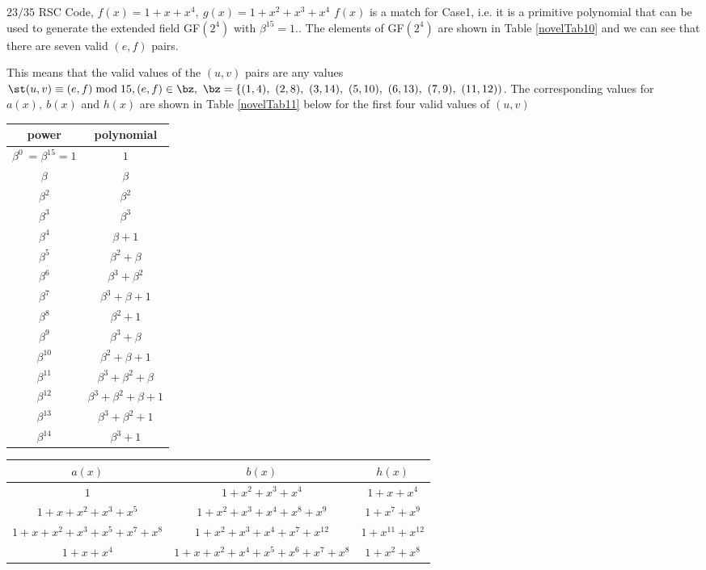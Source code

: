 \begin{example}
$23/35$ RSC Code, $f(x)=1+x+x^4,~g(x)=1+x^2+x^3+x^4$ \newline
$f(x)$ is a match for Case1, i.e. it is a primitive polynomial that can be used to generate the extended field GF$(2^4)$ with $\beta^{15}=1$.. The elements of GF$(2^4)$ are shown in Table \ref{novelTab10} and we can see that there are seven valid $(e,f)$ pairs.
 
 This means that the valid values of the $(u,v)$ pairs are any values $\st (u,v) \equiv (e,f) \bmod 15, (e,f) \in \bz,~\bz=\{(1,4),~(2,8) ,~(3,14) ,~(5,10) ,~(6,13) ,~(7,9) ,~(11,12))$.
 The corresponding values for $a(x),~b(x)$ and $h(x)$ are shown in Table \ref{novelTab11} below for the first four valid values of $(u,v)$
 
  \begin{table*}[h]
 \caption{Non-zero Elements of GF$(2^4)$ generated by $f(x)=1+x+x^4$}
\centering
 \begin{tabular}{c c} 
 \hline
 power & polynomial \\ [0.5ex] 
 \hline\hline
$\beta^0~=\beta^{15}=1$ & $1$\\
\hline
$\beta$ & $\beta$\\
\hline
$\beta^2$ &  $\beta^2$\\
\hline
$\beta^3$ & $\beta^3$\\
\hline
$\beta^4$ &  $\beta+1$\\
\hline
$\beta^5$ & $\beta^2+\beta$\\
\hline
$\beta^6$ &  $\beta^3+\beta^2$\\
\hline
$\beta^7$ & $\beta^3+\beta+1$\\
\hline
$\beta^8$ &  $\beta^2+1$\\
\hline
$\beta^9$ & $\beta^3+\beta$\\
\hline
$\beta^{10}$ &  $\beta^2+\beta+1$\\
\hline
$\beta^{11}$ & $\beta^3+\beta^2+\beta$\\
\hline
$\beta^{12}$ &  $\beta^3+\beta^2+\beta+1$\\
\hline
$\beta^{13}$ & $\beta^3+\beta^2+1$\\
\hline
$\beta^{14}$ &  $\beta^3+1$\\
 \end{tabular}
 \label{novelTab10}
\end{table*}
 
 \begin{table*}[h]
 \caption{$23/35$ RSC, $f(x)=1+x+x^4$}
\centering
 \begin{tabular}{c c c} 
 \hline
 $a(x)$ & $b(x)$ & $h(x)$\\ [0.5ex] 
 \hline\hline
$1$ & $1+x^2+x^3+x^4$ & $1+x+x^4$\\ 
\hline
$1+x+x^2+x^3+x^5$ &  $1+x^2+x^3+x^4+x^8+x^9$ & $1+x^7+x^9$ \\
\hline
$1+x+x^2+x^3+x^5+x^7+x^8$ & $1+x^2+x^3+x^4+x^7+x^{12}$ & $1+x^{11}+x^{12}$\\
\hline
$1+x+x^4$ & $1+x+x^2+x^4+x^5+x^6+x^7+x^8$  &$1+x^2+x^8$
 \end{tabular}
 \label{novelTab11}
\end{table*}
 

\end{example}
